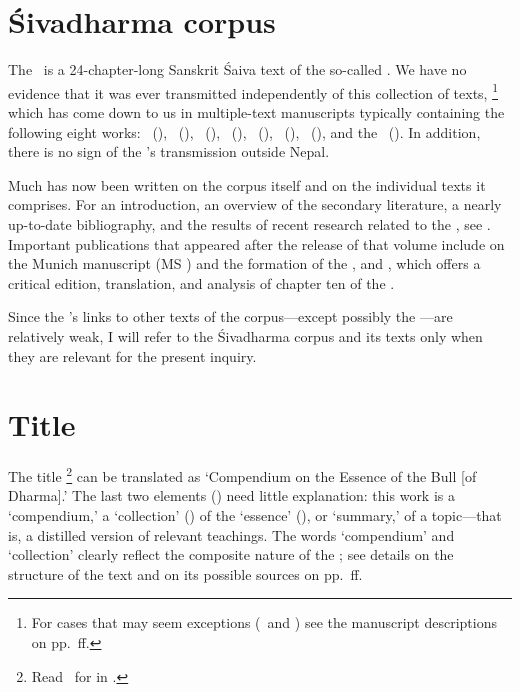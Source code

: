 

\thispagestyle{empty}
\frenchspacing

\section{Śivadharma corpus}
\fancyhead[LE]{}
\fancyhead[RE]{}
\fancyhead[LO]{}
\fancyhead[RO]{}

The \Vss\ is a 24-chapter-long Sanskrit Śaiva text of the 
so-called \Sivadharmacorpus.  We have no evidence that it
was ever transmitted independently of this collection of texts,%
		\footnote{For cases that may seem exceptions 
		(\msKob\ and \msPaperA)
                see the manuscript descriptions
                on pp.~\pageref{mss_descr}ff.}
which has come down to us in multiple-text manuscripts typically containing the following eight works:
\SDhS\ (\SDHS), \SDhU\ (\SDHU), \SDhSangr\ (\SDHSANGR),
\Ums\ (\UMS), \Uums\ (\UUMS), \Vss\ (\VSS), \DharmP\ (\DHARMP), and the \SivaUp\ (\SIVAUP).
In addition, there is no sign of the \VSS's transmission outside Nepal.

Much has now been written on the corpus itself and on the individual texts it comprises. 
For an introduction, an overview of the secondary literature, 
a nearly up-to-date bibliography, and the results of recent research related to the \Sivadharma,
see . Important publications that appeared after the release of that volume
include  on the Munich manuscript (MS \msM) and the formation of the \Sivadharmacorpus,
and , which offers a critical edition, translation, and analysis of chapter ten of the 
\SDhS.


Since the \VSS's links to other texts of the corpus---except possibly the 
\DharmP---are relatively weak, I will refer to the Śivadharma corpus and
its texts only when they are relevant for the present inquiry.



\section{Title}\label{title}
The title \Vss%
	\footnote{Read \Vss\ for 
	in .}
can be translated as `Compendium on the Essence of the Bull [of Dharma].'
The last two elements () need
little explanation: this work is a `compendium,' a `collection' ()
of the `essence' (), or `summary,' of a topic---that is, a distilled
version of relevant teachings.
The words `compendium' and `collection' clearly reflect the composite nature of
the \VSS; see details on the structure of the text and
on its possible sources on pp.~\pageref{structure}ff.

